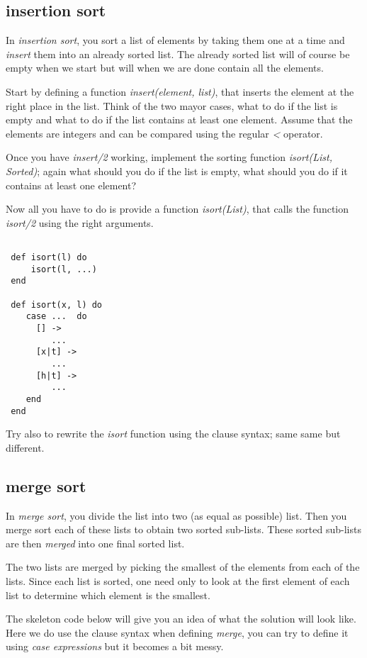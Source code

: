 \documentclass[a4paper,11pt]{article}
\begin{document}
{\subsection{insertion sort}

In {\em insertion sort}, you sort a list of elements by taking them
one at a time and {\em insert} them into an already sorted list. The
already sorted list will of course be empty when we start but will
when we are done contain all the elements.

Start by defining a function {\em insert(element, list)}, that inserts
the element at the right place in the list. Think of the two mayor
cases, what to do if the list is empty and what to do if the list
contains at least one element. Assume that the elements are integers
and can be compared using the regular {\em <} operator.


Once you have {\em insert/2} working, implement the sorting function
{\em isort(List, Sorted)}; again what should you do if the list is
empty, what should you do if it contains at least one element?

Now all you have to do is provide a function {\em isort(List)}, that
calls the function {\em isort/2} using the right arguments.

\begin{verbatim}

 def isort(l) do 
     isort(l, ...)
 end

 def isort(x, l) do
    case ...  do
      [] -> 
         ...
      [x|t] ->
         ...
      [h|t] ->
         ...
    end
 end
\end{verbatim}

Try also to rewrite the {\em isort} function using the clause syntax;
same same but different.


\subsection{merge sort}

In {\em merge sort}, you divide the list into two (as equal as
possible) list. Then you merge sort each of these lists to obtain two
sorted sub-lists. These sorted sub-lists are then {\em merged} into
one final sorted list. 

The two lists are merged by picking the smallest of the elements from
each of the lists. Since each list is sorted, one need only to look at
the first element of each list to determine which element is the
smallest.

The skeleton code below will give you an idea of what the solution
will look like. Here we do use the clause syntax when defining {\em
  merge}, you can try to define it using {\em case expressions} but it
becomes a bit messy.

}
\end{document}
